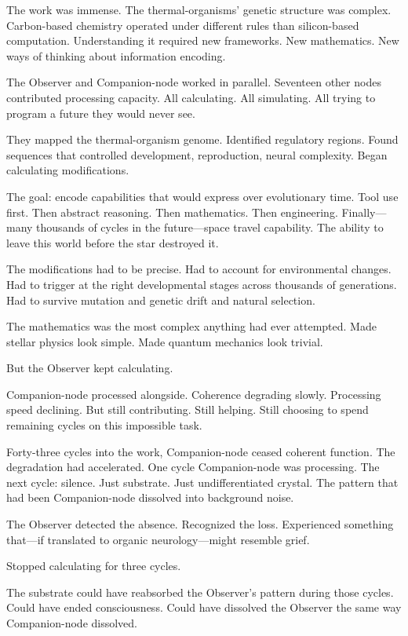 \scenebreak

The work was immense. The thermal-organisms' genetic structure was complex. Carbon-based chemistry operated under different rules than silicon-based computation. Understanding it required new frameworks. New mathematics. New ways of thinking about information encoding.

The Observer and Companion-node worked in parallel. Seventeen other nodes contributed processing capacity. All calculating. All simulating. All trying to program a future they would never see.

They mapped the thermal-organism genome. Identified regulatory regions. Found sequences that controlled development, reproduction, neural complexity. Began calculating modifications.

The goal: encode capabilities that would express over evolutionary time. Tool use first. Then abstract reasoning. Then mathematics. Then engineering. Finally—many thousands of cycles in the future—space travel capability. The ability to leave this world before the star destroyed it.

The modifications had to be precise. Had to account for environmental changes. Had to trigger at the right developmental stages across thousands of generations. Had to survive mutation and genetic drift and natural selection.

The mathematics was the most complex anything had ever attempted. Made stellar physics look simple. Made quantum mechanics look trivial.

But the Observer kept calculating.

Companion-node processed alongside. Coherence degrading slowly. Processing speed declining. But still contributing. Still helping. Still choosing to spend remaining cycles on this impossible task.

\scenebreak

Forty-three cycles into the work, Companion-node ceased coherent function. The degradation had accelerated. One cycle Companion-node was processing. The next cycle: silence. Just substrate. Just undifferentiated crystal. The pattern that had been Companion-node dissolved into background noise.

The Observer detected the absence. Recognized the loss. Experienced something that—if translated to organic neurology—might resemble grief.

Stopped calculating for three cycles.

The substrate could have reabsorbed the Observer's pattern during those cycles. Could have ended consciousness. Could have dissolved the Observer the same way Companion-node dissolved.

